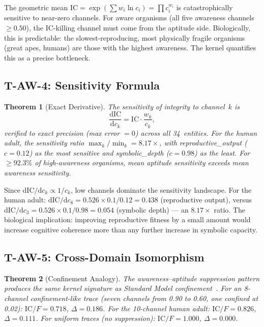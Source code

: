 \documentclass[
  aps,
  prd,
  twocolumn,
  superscriptaddress,
  nofootinbib,
  floatfix
]{revtex4-2}
\newtheorem{theorem}{Theorem}
\newcommand{\dd}{\mathrm{d}}
\newcommand{\beq}{\begin{equation}}
\newcommand{\eeq}{\end{equation}}
\newcommand{\IC}{\mathrm{IC}}
\begin{document}
The geometric mean $\IC = \exp(\sum w_i \ln c_i) =
\prod c_i^{w_i}$ is catastrophically sensitive to near-zero
channels.  For aware organisms (all five awareness channels
$\geq 0.50$), the $\IC$-killing channel must come from the
aptitude side.  Biologically, this is predictable: the
slowest-reproducing, most physically fragile organisms
(great apes, humans) are those with the highest awareness.
The kernel quantifies this as a precise bottleneck.

\subsection{T-AW-4: Sensitivity Formula}

\begin{theorem}[Exact Derivative]\label{thm:TAW4}
The sensitivity of integrity to channel~$k$ is
\beq\label{eq:sensitivity}
  \frac{\dd\IC}{\dd c_k} = \IC \cdot \frac{w_k}{c_k},
\eeq
verified to exact precision (max error $= 0$) across all
34~entities.  For the human adult, the sensitivity ratio
$\max_k / \min_k = 8.17\!\times$, with
\textup{reproductive\_output} ($c = 0.12$) as the most
sensitive and \textup{symbolic\_depth} ($c = 0.98$) as
the least.  For $\geq 92.3\%$ of high-awareness organisms,
mean aptitude sensitivity exceeds mean awareness sensitivity.
\end{theorem}

Since $\dd\IC/\dd c_k \propto 1/c_k$, low channels dominate
the sensitivity landscape.  For the human adult:
$\dd\IC/\dd c_{8} = 0.526 \times 0.1/0.12 = 0.438$
(reproductive output), versus
$\dd\IC/\dd c_{3} = 0.526 \times 0.1/0.98 = 0.054$
(symbolic depth) --- an $8.17\!\times$ ratio.  The
biological implication: improving reproductive fitness by
a small amount would increase cognitive coherence more than
any further increase in symbolic capacity.

\subsection{T-AW-5: Cross-Domain Isomorphism}

\begin{theorem}[Confinement Analogy]\label{thm:TAW5}
The awareness--aptitude suppression pattern produces the same
kernel signature as Standard Model
confinement~\cite{paulus2026sm,wilson1974confinement}.
For an 8-channel confinement-like trace (seven channels from
0.90 to 0.60, one confined at 0.02):
$\IC/F = 0.718$, $\Delta = 0.186$.
For the 10-channel human adult:
$\IC/F = 0.826$, $\Delta = 0.111$.
For uniform traces (no suppression):
$\IC/F = 1.000$, $\Delta = 0.000$.
\end{theorem}
\end{document}

